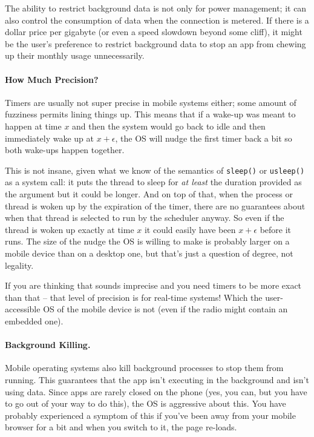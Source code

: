 The ability to restrict background data is not only for power management; it can also control the consumption of data when the connection is metered. If there is a dollar price per gigabyte (or even a speed slowdown beyond some cliff), it might be the user's preference to restrict background data to stop an app from chewing up their monthly usage unnecessarily. 

\paragraph{How Much Precision?} Timers are usually not super precise in mobile systems either; some amount of fuzziness permits lining things up. This means that if a wake-up was meant to happen at time $x$ and then the system would go back to idle and then immediately wake up at $x+\epsilon$, the OS will nudge the first timer back a bit so both wake-ups happen together. 

This is not insane, given what we know of the semantics of \texttt{sleep()} or \texttt{usleep()} as a system call: it puts the thread to sleep for \textit{at least} the duration provided as the argument but it could be longer. And on top of that, when the process or thread is woken up by the expiration of the timer, there are no guarantees about when that thread is selected to run by the scheduler anyway. So even if the thread is woken up exactly at time $x$ it could easily have been $x+\epsilon$ before it runs. The size of the nudge the OS is willing to make is probably larger on a mobile device than on a desktop one, but that's just a question of degree, not legality.

If you are thinking that sounds imprecise and you need timers to be more exact than that -- that level of precision is for real-time systems! Which the user-accessible OS of the mobile device is not (even if the radio might contain an embedded one). 

\paragraph{Background Killing.}
Mobile operating systems also kill background processes to stop them from running. This guarantees that the app isn't executing in the background and isn't using data. Since apps are rarely closed on the phone (yes, you can, but you have to go out of your way to do this), the OS is aggressive about this. You have probably experienced a symptom of this if you've been away from your mobile browser for a bit and when you switch to it, the page re-loads.

